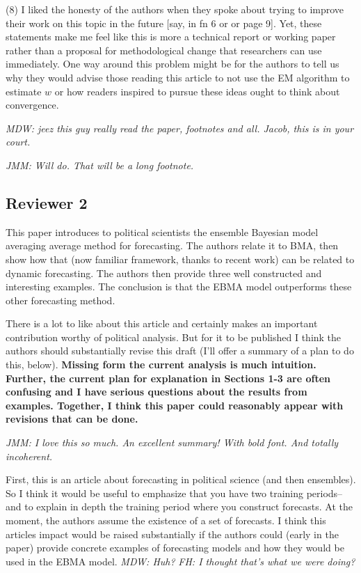 \documentclass[10pt]{article}
\begin{document}
(8) I liked the honesty of the authors when they spoke about trying to
improve their work on this topic in the future [say, in fn 6 or or
page 9]. Yet, these statements make me feel like this is more a
technical report or working paper rather than a proposal for
methodological change that researchers can use immediately. One way
around this problem might be for the authors to tell us why they
would advise those reading this article to not use the EM algorithm to
estimate $w$ or how readers inspired to pursue these ideas ought to
think about convergence. 

 {\it MDW: jeez this guy really read the paper, footnotes and all. Jacob, this is in your court.}

 {\it JMM: Will do.  That will be a long footnote.}


\subsection{Reviewer 2}

This paper introduces to political scientists the ensemble Bayesian model averaging average method for forecasting.  The authors relate it to BMA, then show how that (now familiar framework, thanks to recent work) can be related to dynamic forecasting.  The authors then provide three well constructed and interesting examples.  The conclusion is that the EBMA model outperforms these other forecasting method.  

There is a lot to like about this article and certainly makes an important contribution worthy of political analysis.  But for it to be published I think the authors should substantially revise this draft (I'll offer a summary of a plan to do this, below). {\bf Missing form the current analysis is much intuition. Further, the current plan for explanation in Sections 1-3 are often confusing and I have serious questions about the results from examples.  Together, I think this paper could reasonably appear with revisions that can be done.  }  

{\it JMM: I love this so much.  An excellent summary!  With bold font.  And totally incoherent.}

First, this is an article about forecasting in political science (and then ensembles). So I think it would be useful to emphasize that you have two training periods--and to explain in depth the training period where you construct forecasts.  At the moment, the authors assume the existence of a set of forecasts.  I think this articles impact would be raised substantially if the authors could (early in the paper) provide concrete examples of forecasting models and how they would be used in the EBMA model.  {\it MDW: Huh?} {\it FH: I thought that's what we were doing?}
\end{document}
